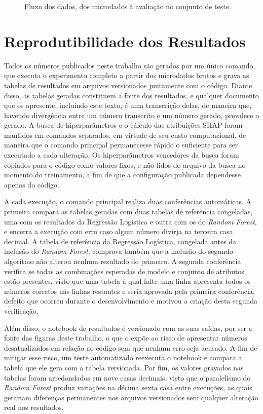 \begin{figure}[htb]
  \centering
  \caption{\label{fig:fluxo-dados}Fluxo dos dados, dos microdados à avaliação no conjunto de teste.}
  
\end{figure}

\section{Reprodutibilidade dos Resultados}\label{sec:reprodutibilidade}
Todos os números publicados neste trabalho são gerados por um único comando, que executa o experimento completo a partir dos microdados brutos e grava as tabelas de resultados em arquivos versionados juntamente com o código. Diante disso, as tabelas geradas constituem a fonte dos resultados, e qualquer documento que os apresente, incluindo este texto, é uma transcrição delas, de maneira que, havendo divergência entre um número transcrito e um número gerado, prevalece o gerado. A busca de hiperparâmetros e o cálculo das atribuições SHAP foram mantidos em comandos separados, em virtude de seu custo computacional, de maneira que o comando principal permanecesse rápido o suficiente para ser executado a cada alteração. Os hiperparâmetros vencedores da busca foram copiados para o código como valores fixos, e não lidos do arquivo da busca no momento do treinamento, a fim de que a configuração publicada dependesse apenas do código.

A cada execução, o comando principal realiza duas conferências automáticas. A primeira compara as tabelas geradas com duas tabelas de referência congeladas, uma com os resultados da Regressão Logística e outra com os do \textit{Random Forest}, e encerra a execução com erro caso algum número divirja na terceira casa decimal. A tabela de referência da Regressão Logística, congelada antes da inclusão do \textit{Random Forest}, comprova também que a inclusão do segundo algoritmo não alterou nenhum resultado do primeiro. A segunda conferência verifica se todas as combinações esperadas de modelo e conjunto de atributos estão presentes, visto que uma tabela à qual falte uma linha apresenta todos os números corretos nas linhas restantes e seria aprovada pela primeira conferência, defeito que ocorreu durante o desenvolvimento e motivou a criação desta segunda verificação.

Além disso, o notebook de resultados é versionado com as suas saídas, por ser a fonte das figuras deste trabalho, o que o expõe ao risco de apresentar números desatualizados em relação ao código sem que nenhum erro seja acusado. A fim de mitigar esse risco, um teste automatizado reexecuta o notebook e compara a tabela que ele gera com a tabela versionada. Por fim, os valores gravados nas tabelas foram arredondados em nove casas decimais, visto que o paralelismo do \textit{Random Forest} produz variações na décima sexta casa entre execuções, as quais gerariam diferenças permanentes nos arquivos versionados sem qualquer alteração real nos resultados.

